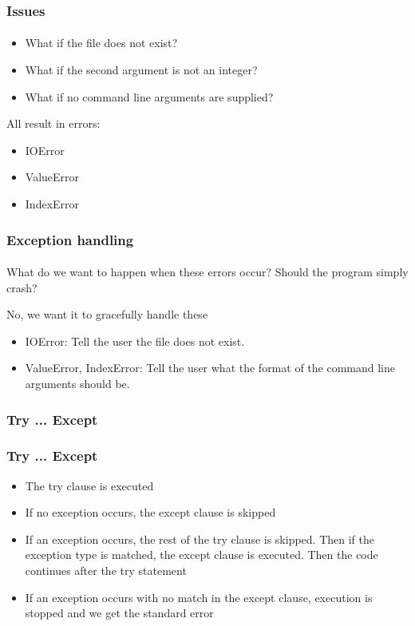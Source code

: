 \begin{frame}\frametitle{Issues}
    \framesubtitle{}

    \begin{itemize}
        \item What if the file does not exist?
        \item What if the second argument is not an integer?
        \pause
        \item What if no command line arguments are supplied?
    \end{itemize}
    \pause

    All result in errors:

    \begin{itemize}
        \item IOError
        \item ValueError
        \item IndexError
    \end{itemize}

\end{frame}

\begin{frame}\frametitle{Exception handling}
    \framesubtitle{}

    What do we want to happen when these errors occur? Should the program simply crash?

    \pause

    No, we want it to gracefully handle these

    \begin{itemize}
        \item IOError: Tell the user the file does not exist.
        \item ValueError, IndexError: Tell the user what the format of the command
        line arguments should be.
    \end{itemize}

\end{frame}

\begin{frame}\frametitle{Try ... Except}
    \framesubtitle{}


\end{frame}

\begin{frame}\frametitle{Try ... Except}

    \begin{itemize}
        \item The try clause is executed
        \item If no exception occurs, the except clause is skipped
        \pause
        \item If an exception occurs, the rest of the try clause is skipped.
        Then if the exception type is matched, the except clause is executed.
        Then the code continues after the try statement
        \pause
        \item If an exception occurs with no match in the except clause, execution
        is stopped and we get the standard error
    \end{itemize}

\end{frame}

